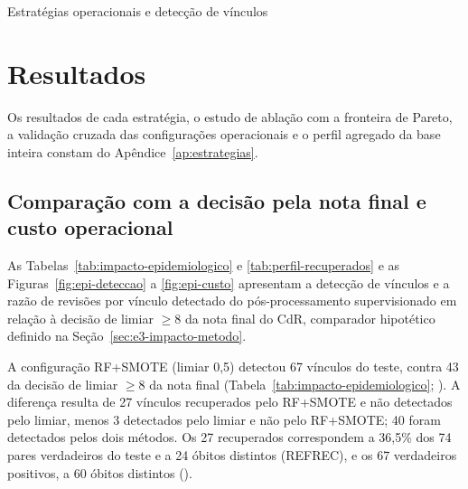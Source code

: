 \begin{chapter}{Estratégias operacionais e detecção de vínculos}
\section{Resultados}\label{sec:e3-resultados}

Os resultados de cada estratégia, o estudo de ablação com a fronteira de Pareto, a validação cruzada das configurações operacionais e o perfil agregado da base inteira constam do Apêndice~\ref{ap:estrategias}.

\subsection{Comparação com a decisão pela nota final e custo operacional}\label{sec:e3-impacto-epidemiologico}

As Tabelas~\ref{tab:impacto-epidemiologico} e \ref{tab:perfil-recuperados} e as Figuras~\ref{fig:epi-deteccao} a \ref{fig:epi-custo} apresentam a detecção de vínculos e a razão de revisões por vínculo detectado do pós-processamento supervisionado em relação à decisão de limiar $\geq 8$ da nota final do CdR, comparador hipotético definido na Seção~\ref{sec:e3-impacto-metodo}.

A configuração RF+SMOTE (limiar 0,5) detectou 67 vínculos do teste, contra 43 da decisão de limiar $\geq 8$ da nota final (Tabela~\ref{tab:impacto-epidemiologico}; ). A diferença resulta de 27 vínculos recuperados pelo RF+SMOTE e não detectados pelo limiar, menos 3 detectados pelo limiar e não pelo RF+SMOTE; 40 foram detectados pelos dois métodos. Os 27 recuperados correspondem a 36,5\% dos 74 pares verdadeiros do teste e a 24 óbitos distintos (REFREC), e os 67 verdadeiros positivos, a 60 óbitos distintos ().


\end{chapter}
